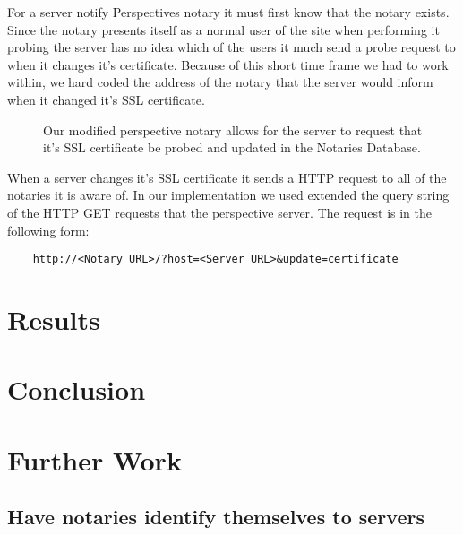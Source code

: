 \documentclass[preprint,review,12pt]{elsarticle}
\begin{document}
For a server notify Perspectives notary it must first know that the notary
exists. Since the notary presents itself as a normal user of the site when
performing it probing the server has no idea which of the users it much send a
probe request to when it changes it's certificate. Because of this short time
frame we had to work within, we hard coded the address of the notary that the
server would inform when it changed it's SSL certificate.

\begin{figure}[h]
\caption{Our modified perspective notary allows for the server to request that
    it's SSL certificate be probed and updated in the Notaries Database.}
\end{figure}

When a server changes it's SSL certificate it sends a HTTP request to all of
the notaries it is aware of. In our implementation we used extended the query
string of the HTTP GET requests that the perspective server. The request is in
the following form:

\begin{verbatim}
    http://<Notary URL>/?host=<Server URL>&update=certificate
\end{verbatim}

\section{Results}
\label{results}

\section{Conclusion}
\label{conclusion}

\section{Further Work}
\label{further work}

\subsection{Have notaries identify themselves to servers}
\end{document}
